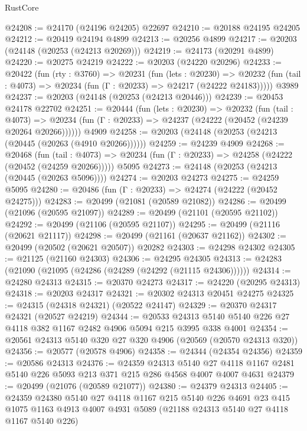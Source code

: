 \begin{lexlean}{RustCore}
\begin{coremodule}
@24208 := @24170 (@24196 @24205) @22697
@24210 := @20188 @24195 @24205
@24212 := @20419 @24194 @4899
@24213 := @20256 @4899
@24217 := @20203 (@24148 (@20253 (@24213 @20269)))
@24219 := @24173 (@20291 @4899)
@24220 := @20275 @24219
@24222 := @20203 (@24220 @20296)
@24233 := @20422
    (fun (rty : @3760) =>
    @20231
      (fun (lets : @20230) =>
      @20232 (fun (tail : @4073) => @20234 (fun (Γ : @20233) => @24217 (@24222 @24183)))))
    @3989
@24237 := @20203 (@24148 (@20253 (@24213 @20446)))
@24239 := @20453 @24178 @22702
@24251 := @20444
    (fun (lets : @20230) =>
    @20232
      (fun (tail : @4073) =>
      @20234 (fun (Γ : @20233) => @24237 (@24222 (@20452 (@24239 @20264 @20266))))))
    @4909
@24258 := @20203 (@24148 (@20253 (@24213 (@20445 (@20263 (@4910 @20266))))))
@24259 := @24239 @4909
@24268 := @20468
    (fun (tail : @4073) => @20234 (fun (Γ : @20233) => @24258 (@24222 (@20452 (@24259 @20266)))))
    @5095
@24273 := @24148 (@20253 (@24213 (@20445 (@20263 @5096))))
@24274 := @20203 @24273
@24275 := @24259 @5095
@24280 := @20486 (fun (Γ : @20233) => @24274 (@24222 (@20452 @24275)))
@24283 := @20499 (@21081 (@20589 @21082))
@24286 := @20499 (@21096 (@20595 @21097))
@24289 := @20499 (@21101 (@20595 @21102))
@24292 := @20499 (@21106 (@20595 @21107))
@24295 := @20499 (@21116 (@20621 @21117))
@24298 := @20499 (@21161 (@20637 @21162))
@24302 := @20499 (@20502 (@20621 @20507)) @20282
@24303 := @24298 @24302
@24305 := @21125 (@21160 @24303)
@24306 := @24295 @24305
@24313 := @24283 (@21090 (@21095 (@24286 (@24289 (@24292 (@21115 @24306))))))
@24314 := @24280 @24313
@24315 := @20370 @24273
@24317 := @24220 (@20295 @24313)
@24318 := @20203 @24317
@24321 := @20302 @24313 @20451 @24275
@24325 := @24315 (@24318 @24321) (@20522 @24147)
@24329 := @20370 @24317 @24321 (@20527 @24219)
@24344 := @20533
    @24313
    @5140
    @5140
    @226
    @27
    @4118
    @382
    @1167
    @2482
    @4906
    @5094
    @215
    @3995
    @338
    @4001
@24354 := @20561 @24313 @5140 @320 @27 @320 @4906 (@20569 (@20570 @24313 @320))
@24356 := @20577 (@20578 @4906)
@24358 := @24344 (@24354 @24356)
@24359 := @20586 @24313
@24376 := @24359
    @24313
    @5140
    @27
    @4118
    @1167
    @2481
    @5140
    @226
    @5093
    @213
    @371
    @215
    @286
    @4568
    @4007
    @4007
    @4631
@24379 := @20499 (@21076 (@20589 @21077))
@24380 := @24379 @24313
@24405 := @24359
    @24380
    @5140
    @27
    @4118
    @1167
    @215
    @5140
    @226
    @4691
    @23
    @415
    @1075
    @1163
    @4913
    @4007
    @4931
    @5089
    (@21188 @24313 @5140 @27 @4118 @1167 @5140 @226)

\end{coremodule}
\end{lexlean}
